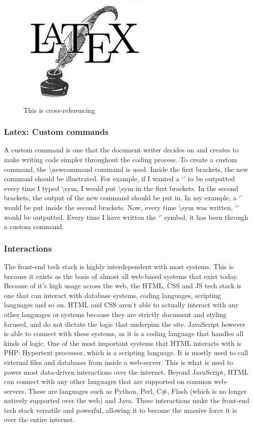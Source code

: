 \documentclass[a4paper, 11pt]{report}
\begin{document}
\begin{figure}[h]
\centering
\includegraphics{latex.jpg}
\caption{This is cross-referencing}
\label{example}
\end{figure}

\subsubsection{Latex: Custom commands}
\newcommand{\sym}{
{`'}
}
A custom command is one that the document writer decides on and creates to make writing code simpler throughout the coding process. To create a custom command, the \textbackslash newcommand{}{} command is used. Inside the first brackets, the new command should be illustrated. For example, if I wanted a \sym to be outputted every time I typed \textbackslash sym, I would put \textbackslash sym in the first brackets. In the second brackets, the output of the new command should be put in. In my example, a \sym would be put inside the second brackets. Now, every time \textbackslash sym was written, \sym would be outputted. Every time I have written the \sym symbol, it has been through a custom command.\cite{jake12}

\subsubsection{Interactions}
The front-end tech stack is highly interdependent with most systems. This is because it exists as the basis of almost all web-based systems that exist today. Because of it’s high usage across the web, the HTML, CSS and JS tech stack is one that can interact with database systems, coding languages, scripting languages and so on.
HTML and CSS aren’t able to actually interact with any other languages or systems because they are strictly document and styling focused, and do not dictate the logic that underpins the site. JavaScript however is able to connect with these systems, as it is a coding language that handles all kinds of logic.
One of the most important systems that HTML interacts with is PHP: Hypertext processor, which is a scripting language. It is mostly used to call external files and databases from inside a web-server. This is what is used to power most data-driven interactions over the internet.
Beyond JavaScript, HTML can connect with any other languages that are supported on common web-servers. These are languages such as Python, Perl, C#, Flash (which is no longer natively supported over the web) and Java.
These interactions make the front-end tech stack versatile and powerful, allowing it to become the massive force it is over the entire internet.
\end{document}
